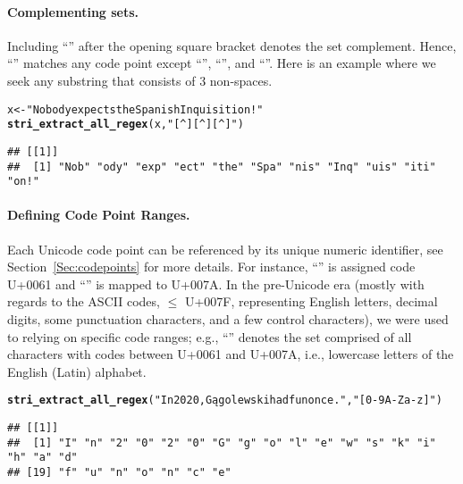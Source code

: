 \documentclass[nojss]{jss}\usepackage[]{graphicx}\usepackage[]{xcolor}
\makeatletter
\newcommand{\hlstr}[1]{\textcolor[rgb]{0.192,0.494,0.8}{#1}}%
\newcommand{\hlstd}[1]{\textcolor[rgb]{0.345,0.345,0.345}{#1}}%
\newcommand{\hlkwb}[1]{\textcolor[rgb]{0.69,0.353,0.396}{#1}}%
\newcommand{\hlkwd}[1]{\textcolor[rgb]{0.737,0.353,0.396}{\textbf{#1}}}%
\newenvironment{kframe}{%
 \def\at@end@of@kframe{}%
 \ifinner\ifhmode%
  \def\at@end@of@kframe{\end{minipage}}%
  \begin{minipage}{\columnwidth}%
 \fi\fi%
 \def\FrameCommand##1{\hskip\@totalleftmargin \hskip-\fboxsep
 \colorbox{shadecolor}{##1}\hskip-\fboxsep
     \hskip-\linewidth \hskip-\@totalleftmargin \hskip\columnwidth}%
 \MakeFramed {\advance\hsize-\width
   \@totalleftmargin\z@ \linewidth\hsize
   \@setminipage}}%
 {\par\unskip\endMakeFramed%
 \at@end@of@kframe}
\newenvironment{knitrout}{}{} %
\makeatother
\begin{document}
\paragraph{Complementing sets.}
Including ``\code{\^{}}'' after the opening square bracket denotes the set complement.
Hence, ``\code{[\^{}abc]}'' matches any code point except ``'',
``'', and ``''.
Here is an example where we seek any substring that consists of 3 non-spaces.

\begin{knitrout}
\color{fgcolor}\begin{kframe}
\begin{alltt}
\hlstd{x} \hlkwb{<-} \hlstr{"Nobody expects the Spanish Inquisition!"}
\hlkwd{stri_extract_all_regex}\hlstd{(x,} \hlstr{"[^ ][^ ][^ ]"}\hlstd{)}
\end{alltt}
\begin{verbatim}
## [[1]]
##  [1] "Nob" "ody" "exp" "ect" "the" "Spa" "nis" "Inq" "uis" "iti" "on!"
\end{verbatim}
\end{kframe}
\end{knitrout}



\paragraph{Defining Code Point Ranges.}
Each Unicode code point can be referenced by its unique numeric identifier,
see Section~\ref{Sec:codepoints}  for more details.
For instance, ``'' is assigned code U+0061 and ``'' is mapped to U+007A.
In the pre-Unicode era (mostly with regards to the ASCII codes, $\le$ U+007F,
representing English letters, decimal digits, some punctuation characters,
and a few control characters),
we were used to relying on specific code ranges; e.g.,
``\code{[a-z]}'' denotes the set comprised of all
characters with codes between U+0061 and U+007A, i.e., lowercase letters
of the English (Latin) alphabet.

\begin{knitrout}
\color{fgcolor}\begin{kframe}
\begin{alltt}
\hlkwd{stri_extract_all_regex}\hlstd{(}\hlstr{"In 2020, Gągolewski had fun once."}\hlstd{,} \hlstr{"[0-9A-Za-z]"}\hlstd{)}
\end{alltt}
\begin{verbatim}
## [[1]]
##  [1] "I" "n" "2" "0" "2" "0" "G" "g" "o" "l" "e" "w" "s" "k" "i" "h" "a" "d"
## [19] "f" "u" "n" "o" "n" "c" "e"
\end{verbatim}
\end{kframe}
\end{knitrout}
\end{document}
